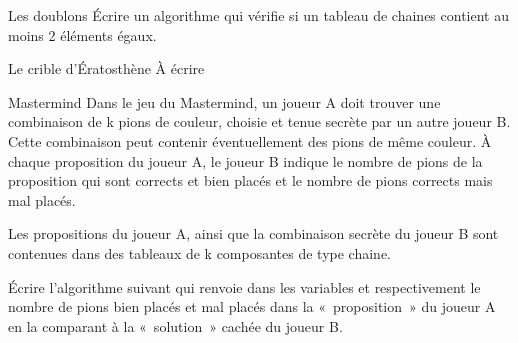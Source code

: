 	\begin{Exercice}{Les doublons}
		Écrire un algorithme qui vérifie 
		si un tableau de chaines
		contient au moins 2 éléments égaux.
	\end{Exercice}	
	\bigskip
	
	\begin{Exercice}{Le crible d'Ératosthène}
		À écrire
	\end{Exercice}
	
	\begin{Exercice}{Mastermind}
		Dans le jeu du Mastermind, 
		un joueur A doit trouver une combinaison de k pions de couleur, 
		choisie et tenue secrète par un autre joueur B. 
		Cette combinaison peut contenir éventuellement des pions de même couleur. 
		À chaque proposition du joueur A, 
		le joueur B indique le nombre de pions de la proposition 
		qui sont corrects et bien placés 
		et le nombre de pions corrects mais mal placés. 
		
		Les propositions du joueur A, 
		ainsi que la combinaison secrète du joueur B
		sont contenues dans des tableaux de k composantes de type chaine.
		
		Écrire l'algorithme suivant qui renvoie dans les variables
		 et 
		respectivement le nombre de pions bien placés et mal placés 
		dans la «~proposition~» du joueur A en la comparant 
		à la «~solution~» cachée du joueur B.
	
		\begin{LDA}
		\end{LDA}
	\end{Exercice}
	
